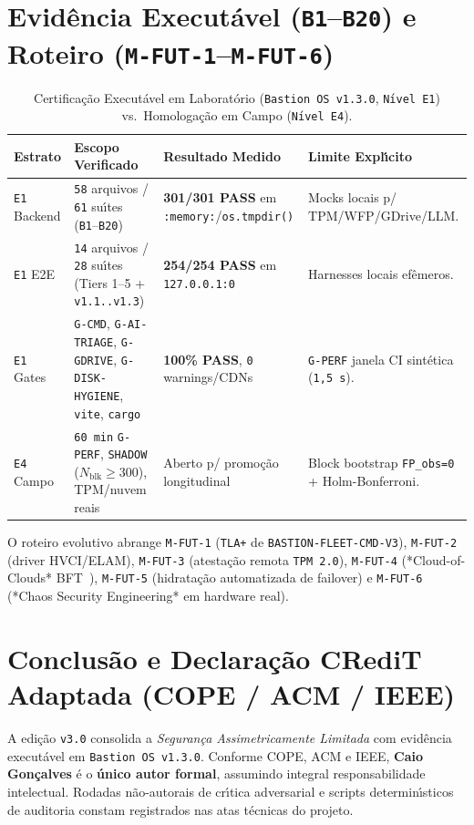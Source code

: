 \documentclass[10pt,twocolumn]{article}
\begin{document}
\section{Evid\^{e}ncia Execut\'{a}vel (\texttt{B1}--\texttt{B20}) e Roteiro (\texttt{M-FUT-1}--\texttt{M-FUT-6})}

\begin{table}[t]
\centering
\caption{Certifica\c{c}\~{a}o Execut\'{a}vel em Laborat\'{o}rio (\texttt{Bastion OS v1.3.0}, \texttt{N\'{\i}vel E1}) vs.\ Homologa\c{c}\~{a}o em Campo (\texttt{N\'{\i}vel E4}).}
\footnotesize
\begin{tabularx}{\textwidth}{@{}l Y Y Y@{}}
\toprule
\textbf{Estrato} & \textbf{Escopo Verificado} & \textbf{Resultado Medido} & \textbf{Limite Expl\'{\i}cito} \\
\midrule
\texttt{E1} Backend & \texttt{58} arquivos / \texttt{61} su\'{\i}tes (\texttt{B1}--\texttt{B20}) & \textbf{301/301 PASS} em \texttt{:memory:}/\texttt{os.tmpdir()} & Mocks locais p/ TPM/WFP/GDrive/LLM. \\
\texttt{E1} E2E & \texttt{14} arquivos / \texttt{28} su\'{\i}tes (Tiers 1--5 + \texttt{v1.1..v1.3}) & \textbf{254/254 PASS} em \texttt{127.0.0.1:0} & Harnesses locais ef\^{e}meros. \\
\texttt{E1} Gates & \texttt{G-CMD}, \texttt{G-AI-TRIAGE}, \texttt{G-GDRIVE}, \texttt{G-DISK-HYGIENE}, \texttt{vite}, \texttt{cargo} & \textbf{100\% PASS}, \texttt{0} warnings/CDNs & \texttt{G-PERF} janela CI sint\'{e}tica (\texttt{1,5 s}). \\
\texttt{E4} Campo & \texttt{60 min} \texttt{G-PERF}, \texttt{SHADOW} ($N_{\mathrm{blk}} \ge 300$), TPM/nuvem reais & Aberto p/ promo\c{c}\~{a}o longitudinal & Block bootstrap \texttt{FP\_obs=0} + Holm-Bonferroni. \\
\bottomrule
\end{tabularx}
\end{table}

O roteiro evolutivo abrange \texttt{M-FUT-1} (\texttt{TLA+} de \texttt{BASTION-FLEET-CMD-V3}), \texttt{M-FUT-2} (driver HVCI/ELAM), \texttt{M-FUT-3} (atesta\c{c}\~{a}o remota \texttt{TPM 2.0}), \texttt{M-FUT-4} (*Cloud-of-Clouds* BFT~\cite{R23}), \texttt{M-FUT-5} (hidrata\c{c}\~{a}o automatizada de failover) e \texttt{M-FUT-6} (*Chaos Security Engineering* em hardware real).

\section{Conclus\~{a}o e Declara\c{c}\~{a}o CRediT Adaptada (COPE / ACM / IEEE)}

A edi\c{c}\~{a}o \texttt{v3.0} consolida a \emph{Seguran\c{c}a Assimetricamente Limitada} com evid\^{e}ncia execut\'{a}vel em \texttt{Bastion OS v1.3.0}. Conforme COPE, ACM e IEEE, \textbf{Caio Gon\c{c}alves} \'{e} o \textbf{\'{u}nico autor formal}, assumindo integral responsabilidade intelectual. Rodadas n\~{a}o-autorais de cr\'{\i}tica adversarial e scripts determin\'{\i}sticos de auditoria constam registrados nas atas t\'{e}cnicas do projeto.



\end{document}
